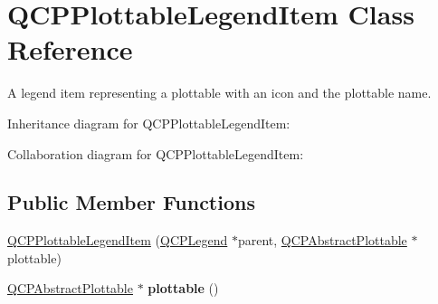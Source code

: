 \hypertarget{classQCPPlottableLegendItem}{}\section{Q\+C\+P\+Plottable\+Legend\+Item Class Reference}
\label{classQCPPlottableLegendItem}


A legend item representing a plottable with an icon and the plottable name.  




Inheritance diagram for Q\+C\+P\+Plottable\+Legend\+Item\+:


Collaboration diagram for Q\+C\+P\+Plottable\+Legend\+Item\+:
\subsection*{Public Member Functions}
\begin{DoxyCompactItemize}
\item 
\hyperlink{classQCPPlottableLegendItem_ac1072591fe409d3dabad51b23ee4d6c5}{Q\+C\+P\+Plottable\+Legend\+Item} (\hyperlink{classQCPLegend}{Q\+C\+P\+Legend} $\ast$parent, \hyperlink{classQCPAbstractPlottable}{Q\+C\+P\+Abstract\+Plottable} $\ast$plottable)
\item 
\hyperlink{classQCPAbstractPlottable}{Q\+C\+P\+Abstract\+Plottable} $\ast$ {\bfseries plottable} ()\hypertarget{classQCPPlottableLegendItem_af29e9a2c60b4cba0cac2447b8af7b488}{}\label{classQCPPlottableLegendItem_af29e9a2c60b4cba0cac2447b8af7b488}

\end{DoxyCompactItemize}
